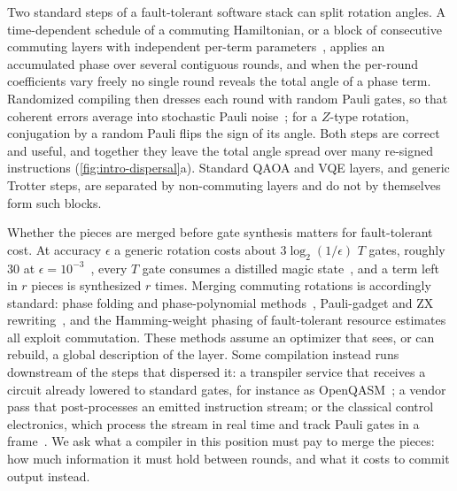 \documentclass[aps,prx,reprint,superscriptaddress,floatfix,longbibliography]{revtex4-2}
\begin{document}
Two standard steps of a fault-tolerant software stack can split rotation
angles.  A time-dependent schedule of a commuting Hamiltonian, or a block
of consecutive commuting layers with independent per-term
parameters~\cite{farhi2014qaoa,herrman2022multiangle,peruzzo2014vqe,cerezo2021variational,childs2021trotter},
applies an accumulated phase over several contiguous rounds, and when the
per-round coefficients vary freely no single round reveals the total angle
of a phase term.  Randomized compiling then dresses each round with random
Pauli gates, so that coherent errors average into stochastic Pauli
noise~\cite{wallman2016noise,hashim2021randomized}; for a $Z$-type
rotation, conjugation by a random Pauli flips the sign of its angle.  Both
steps are correct and useful, and together they leave the total angle
spread over many re-signed instructions (\cref{fig:intro-dispersal}a).
Standard QAOA and VQE layers, and generic Trotter steps, are separated by
non-commuting layers and do not by themselves form such blocks.

Whether the pieces are merged before gate synthesis matters for
fault-tolerant cost.  At accuracy $\epsilon$ a generic rotation costs about
$3\log_2(1/\epsilon)$ $T$ gates, roughly 30 at
$\epsilon=10^{-3}$~\cite{ross2016optimal}, every $T$ gate consumes a
distilled magic state~\cite{bravyi2005magic,litinski2019magic}, and a term
left in $r$ pieces is synthesized $r$ times.  Merging commuting rotations
is accordingly standard: phase folding and phase-polynomial
methods~\cite{amy2014tdepth,nam2018automated,amy2019cnot,amy2025relational,albarghouthi2026lineartime},
Pauli-gadget and ZX
rewriting~\cite{cowtan2020phase,kissinger2020reducing,vandewetering2025optimal},
and the Hamming-weight phasing of fault-tolerant resource
estimates~\cite{gidney2018halving,kivlichan2020improved} all exploit
commutation.  These methods assume an optimizer that sees, or can rebuild,
a global description of the layer.  Some compilation instead runs
downstream of the steps that dispersed it: a transpiler service that
receives a circuit already lowered to standard gates, for instance as
OpenQASM~\cite{cross2022openqasm}; a vendor pass that post-processes an
emitted instruction stream; or the classical control electronics, which
process the stream in real time and track Pauli gates in a
frame~\cite{riesebos2017pauli}.  We ask what a compiler in this position
must pay to merge the pieces: how much information it must hold between
rounds, and what it costs to commit output instead.
\end{document}
